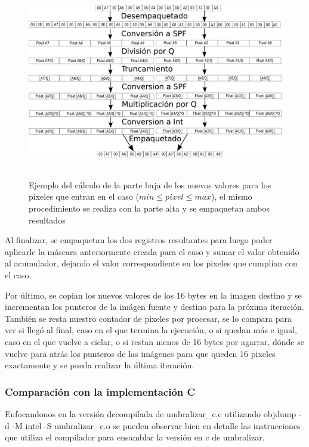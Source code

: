 \begin{figure}[H]
\centering
\includegraphics[width=150mm, height=85mm]{calcq.png}
\caption{Ejemplo del cálculo de la parte baja de los nuevos valores para los pixeles que entran en el caso ($min \leq pixel \leq max$), el mismo procedimiento se realiza con la parte alta y se empaquetan ambos resultados}
\label{overflow}
\end{figure}

Al finalizar, se empaquetan los dos registros resultantes para luego poder aplicarle la máscara anteriormente creada para el caso y sumar el valor obtenido al acumulador, dejando el valor correspondiente en los pixeles que cumplían con el caso.

Por último, se copian los nuevos valores de los 16 bytes en la imagen destino y se incrementan los punteros de la imágen fuente y destino para la próxima iteración. También se resta nuestro contador de pixeles por procesar, se lo compara para ver si llegó al final, caso en el que termina la ejecución, o si quedan más e igual, caso en el que vuelve a ciclar, o si restan menos de 16 bytes por agarrar, dónde se vuelve para atrás los punteros de las imágenes para que queden 16 pixeles exactamente y se pueda realizar la última iteración.

\subsubsection{Comparación con la implementación C}
Enfocandonos en la versión decompilada de umbralizar\_c.c utilizando objdump -d -M intel -S umbralizar\_c.o se pueden observar bien en detalle las instrucciones que utiliza el compilador para ensamblar la versión en c de umbralizar.

